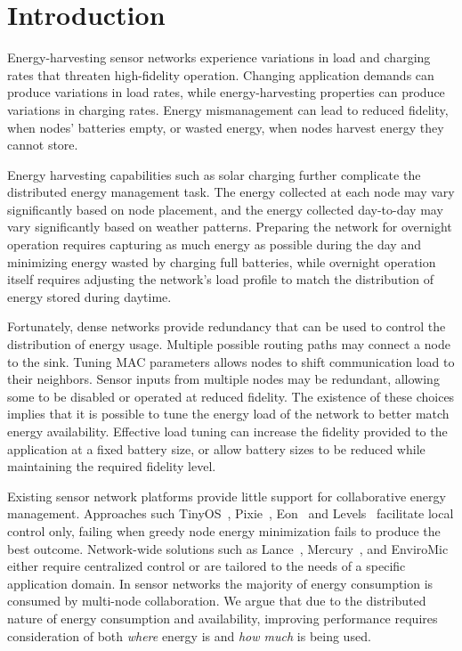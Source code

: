 \section{Introduction}
\label{idea-sec-introduction}

Energy-harvesting sensor networks experience variations in load and charging
rates that threaten high-fidelity operation. Changing application demands can
produce variations in load rates, while energy-harvesting properties can
produce variations in charging rates. Energy mismanagement
can lead to reduced fidelity, when nodes' batteries empty, or wasted energy,
when nodes harvest energy they cannot store.

Energy harvesting capabilities such as solar charging further complicate the
distributed energy management task. The energy collected at each node may
vary significantly based on node placement, and the energy collected
day-to-day may vary significantly based on weather patterns. Preparing the
network for overnight operation requires capturing as much energy as possible
during the day and minimizing energy wasted by charging full batteries, while
overnight operation itself requires adjusting the network's load profile to
match the distribution of energy stored during daytime.

Fortunately, dense networks provide redundancy that can be used to control
the distribution of energy usage.  Multiple possible routing paths may
connect a node to the sink. Tuning MAC parameters allows nodes to shift
communication load to their neighbors. Sensor inputs from multiple nodes may
be redundant, allowing some to be disabled or operated at reduced fidelity.
The existence of these choices implies that it is possible to tune the energy
load of the network to better match energy availability.  Effective load
tuning can increase the fidelity provided to the application at a fixed
battery size, or allow battery sizes to be reduced while maintaining the
required fidelity level.

Existing sensor network platforms provide little support for collaborative
energy management. Approaches such TinyOS~\cite{tinyos-asplos00},
Pixie~\cite{pixie-sensys08}, Eon~\cite{eon-sensys07} and
Levels~\cite{levels-sensys07} facilitate local control only, failing when
greedy node energy minimization fails to produce the best outcome.
Network-wide solutions such as Lance~\cite{lance-sensys08},
Mercury~\cite{parkinsons-embs07}, and EnviroMic~\cite{enviromic} either
require centralized control or are tailored to the needs of a specific
application domain. In sensor networks the majority of energy consumption is
consumed by multi-node collaboration. We argue that due to the distributed
nature of energy consumption and availability, improving performance
requires consideration of both \textit{where} energy is and \textit{how much}
is being used.


